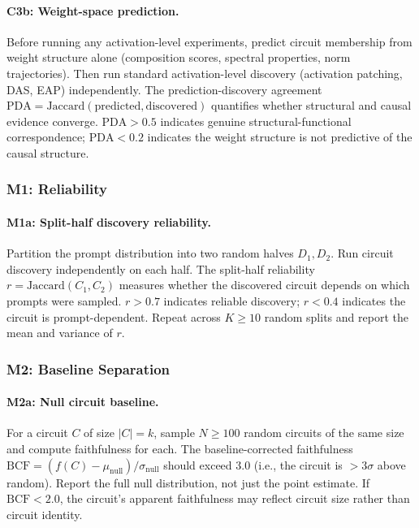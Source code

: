 \documentclass{article}
\begin{document}
\paragraph{C3b: Weight-space prediction.} Before running any activation-level experiments, predict circuit membership from weight structure alone (composition scores, spectral properties, norm trajectories). Then run standard activation-level discovery (activation patching, DAS, EAP) independently. The prediction-discovery agreement $\text{PDA} = \text{Jaccard}(\text{predicted}, \text{discovered})$ quantifies whether structural and causal evidence converge. $\text{PDA} > 0.5$ indicates genuine structural-functional correspondence; $\text{PDA} < 0.2$ indicates the weight structure is not predictive of the causal structure.

\subsubsection{M1: Reliability}

\paragraph{M1a: Split-half discovery reliability.} Partition the prompt distribution into two random halves $D_1, D_2$. Run circuit discovery independently on each half. The split-half reliability $r = \text{Jaccard}(C_1, C_2)$ measures whether the discovered circuit depends on which prompts were sampled. $r > 0.7$ indicates reliable discovery; $r < 0.4$ indicates the circuit is prompt-dependent. Repeat across $K \geq 10$ random splits and report the mean and variance of $r$.

\subsubsection{M2: Baseline Separation}

\paragraph{M2a: Null circuit baseline.} For a circuit $C$ of size $|C| = k$, sample $N \geq 100$ random circuits of the same size and compute faithfulness for each. The baseline-corrected faithfulness $\text{BCF} = (f(C) - \mu_{\text{null}}) / \sigma_{\text{null}}$ should exceed 3.0 (i.e., the circuit is $>3\sigma$ above random). Report the full null distribution, not just the point estimate. If $\text{BCF} < 2.0$, the circuit's apparent faithfulness may reflect circuit size rather than circuit identity.
\end{document}
